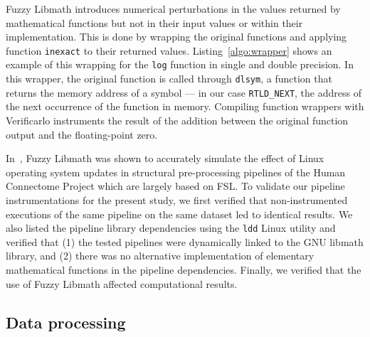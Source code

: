 \documentclass[11pt,onecolumn]{article}
\begin{document}
Fuzzy Libmath introduces numerical perturbations in the values returned by
mathematical functions but not in their input values or within their
implementation. This is done by wrapping the original functions and
applying function \texttt{inexact} to their returned values.
Listing~\ref{algo:wrapper} shows an example of this wrapping for the
\texttt{log} function in single and double precision. In this wrapper, the
original function is called through \texttt{dlsym}, a function that returns
the memory address of a symbol --- in our case \texttt{RTLD\_NEXT}, the
address of the next occurrence of the function in memory. Compiling function wrappers
with Verificarlo instruments the result of the
addition between the original function output and the floating-point zero.



In~\cite{salari2021accurate}, Fuzzy Libmath was shown to accurately
simulate the effect of Linux operating system updates in structural
pre-processing pipelines of the Human Connectome Project which are largely based on FSL.
 To validate our pipeline instrumentations for the present study, we first verified that non-instrumented
executions of the same pipeline on the same dataset led to identical
results. We also listed the pipeline
library dependencies using the \texttt{ldd} Linux utility and verified that
(1) the tested pipelines were dynamically linked to the GNU libmath library, and 
(2) there was no alternative implementation of elementary mathematical functions in the pipeline dependencies.
Finally, we verified that the use of Fuzzy Libmath affected computational results.

\subsection{Data processing}
\end{document}
